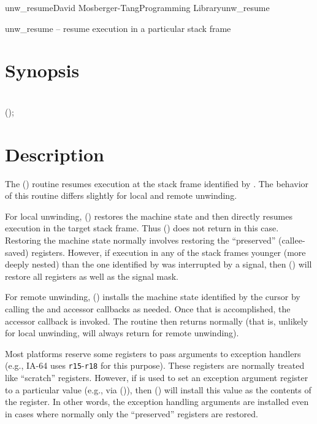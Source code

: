 \documentclass{article}
\begin{document}
\begin{Name}{3}{unw\_resume}{David Mosberger-Tang}{Programming Library}{unw\_resume}

  unw\_resume -- resume execution in a particular stack frame
\end{Name}

\section{Synopsis}

\\

 ();\\

\section{Description}

The () routine resumes execution at the stack frame
identified by .  The behavior of this routine differs
slightly for local and remote unwinding.

For local unwinding, () restores the machine state
and then directly resumes execution in the target stack frame.  Thus
() does not return in this case.  Restoring the
machine state normally involves restoring the ``preserved''
(callee-saved) registers.  However, if execution in any of the stack
frames younger (more deeply nested) than the one identified by
 was interrupted by a signal, then ()
will restore all registers as well as the signal mask.

For remote unwinding, () installs the machine state
identified by the cursor by calling the  and
 accessor callbacks as needed.  Once that is
accomplished, the  accessor callback is invoked.  The
 routine then returns normally (that is, unlikely
for local unwinding,  will always return for remote
unwinding).

Most platforms reserve some registers to pass arguments to exception
handlers (e.g., IA-64 uses \texttt{r15}-\texttt{r18} for this
purpose).  These registers are normally treated like ``scratch''
registers.  However, if  is used to set an exception
argument register to a particular value (e.g., via
()), then () will install this
value as the contents of the register.  In other words, the exception
handling arguments are installed even in cases where normally only the
``preserved'' registers are restored.
\end{document}
